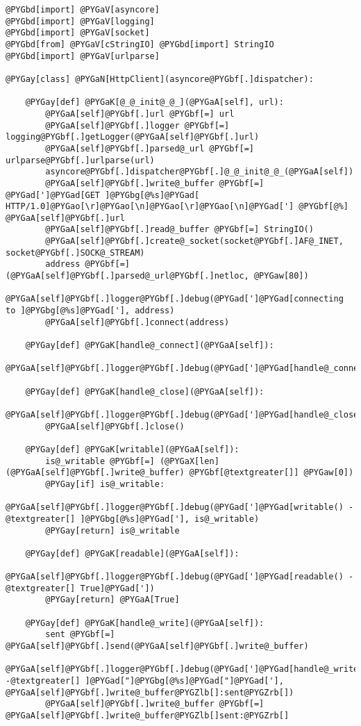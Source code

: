\documentclass[a4paper,10pt,english]{manual}
\begin{document}
\begin{Verbatim}[commandchars=@\[\]]
@PYGbd[import] @PYGaV[asyncore]
@PYGbd[import] @PYGaV[logging]
@PYGbd[import] @PYGaV[socket]
@PYGbd[from] @PYGaV[cStringIO] @PYGbd[import] StringIO
@PYGbd[import] @PYGaV[urlparse]

@PYGay[class] @PYGaN[HttpClient](asyncore@PYGbf[.]dispatcher):

    @PYGay[def] @PYGaK[@_@_init@_@_](@PYGaA[self], url):
        @PYGaA[self]@PYGbf[.]url @PYGbf[=] url
        @PYGaA[self]@PYGbf[.]logger @PYGbf[=] logging@PYGbf[.]getLogger(@PYGaA[self]@PYGbf[.]url)
        @PYGaA[self]@PYGbf[.]parsed@_url @PYGbf[=] urlparse@PYGbf[.]urlparse(url)
        asyncore@PYGbf[.]dispatcher@PYGbf[.]@_@_init@_@_(@PYGaA[self])
        @PYGaA[self]@PYGbf[.]write@_buffer @PYGbf[=] @PYGad[']@PYGad[GET ]@PYGbg[@%s]@PYGad[ HTTP/1.0]@PYGao[\r]@PYGao[\n]@PYGao[\r]@PYGao[\n]@PYGad['] @PYGbf[@%] @PYGaA[self]@PYGbf[.]url
        @PYGaA[self]@PYGbf[.]read@_buffer @PYGbf[=] StringIO()
        @PYGaA[self]@PYGbf[.]create@_socket(socket@PYGbf[.]AF@_INET, socket@PYGbf[.]SOCK@_STREAM)
        address @PYGbf[=] (@PYGaA[self]@PYGbf[.]parsed@_url@PYGbf[.]netloc, @PYGaw[80])
        @PYGaA[self]@PYGbf[.]logger@PYGbf[.]debug(@PYGad[']@PYGad[connecting to ]@PYGbg[@%s]@PYGad['], address)
        @PYGaA[self]@PYGbf[.]connect(address)

    @PYGay[def] @PYGaK[handle@_connect](@PYGaA[self]):
        @PYGaA[self]@PYGbf[.]logger@PYGbf[.]debug(@PYGad[']@PYGad[handle@_connect()]@PYGad['])

    @PYGay[def] @PYGaK[handle@_close](@PYGaA[self]):
        @PYGaA[self]@PYGbf[.]logger@PYGbf[.]debug(@PYGad[']@PYGad[handle@_close()]@PYGad['])
        @PYGaA[self]@PYGbf[.]close()

    @PYGay[def] @PYGaK[writable](@PYGaA[self]):
        is@_writable @PYGbf[=] (@PYGaX[len](@PYGaA[self]@PYGbf[.]write@_buffer) @PYGbf[@textgreater[]] @PYGaw[0])
        @PYGay[if] is@_writable:
            @PYGaA[self]@PYGbf[.]logger@PYGbf[.]debug(@PYGad[']@PYGad[writable() -@textgreater[] ]@PYGbg[@%s]@PYGad['], is@_writable)
        @PYGay[return] is@_writable

    @PYGay[def] @PYGaK[readable](@PYGaA[self]):
        @PYGaA[self]@PYGbf[.]logger@PYGbf[.]debug(@PYGad[']@PYGad[readable() -@textgreater[] True]@PYGad['])
        @PYGay[return] @PYGaA[True]

    @PYGay[def] @PYGaK[handle@_write](@PYGaA[self]):
        sent @PYGbf[=] @PYGaA[self]@PYGbf[.]send(@PYGaA[self]@PYGbf[.]write@_buffer)
        @PYGaA[self]@PYGbf[.]logger@PYGbf[.]debug(@PYGad[']@PYGad[handle@_write() -@textgreater[] ]@PYGad["]@PYGbg[@%s]@PYGad["]@PYGad['], @PYGaA[self]@PYGbf[.]write@_buffer@PYGZlb[]:sent@PYGZrb[])
        @PYGaA[self]@PYGbf[.]write@_buffer @PYGbf[=] @PYGaA[self]@PYGbf[.]write@_buffer@PYGZlb[]sent:@PYGZrb[]


\end{Verbatim}
\end{document}
